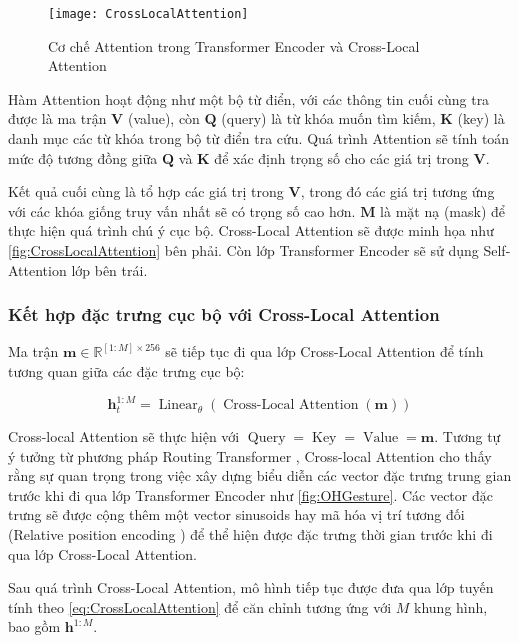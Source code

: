\begin{figure}[H]
	\centering
	\texttt{[image: CrossLocalAttention]}
	\caption{Cơ chế Attention trong Transformer Encoder và Cross-Local Attention}
	\label{fig:CrossLocalAttention}
\end{figure}

Hàm Attention hoạt động như một bộ từ điển, với các thông tin cuối cùng tra được là ma trận $\mathbf{V}$ (value), còn $\mathbf{Q}$ (query) là từ khóa muốn tìm kiếm, $\mathbf{K}$ (key) là danh mục các từ khóa trong bộ từ điển tra cứu. Quá trình Attention sẽ tính toán mức độ tương đồng giữa \( \mathbf{Q} \) và \( \mathbf{K} \) để xác định trọng số cho các giá trị trong \( \mathbf{V} \). 

Kết quả cuối cùng là tổ hợp các giá trị trong \( \mathbf{V} \), trong đó các giá trị tương ứng với các khóa giống truy vấn nhất sẽ có trọng số cao hơn. $\mathbf{M}$ là mặt nạ (mask) để thực hiện quá trình chú ý cục bộ. Cross-Local Attention sẽ được minh họa như \autoref{fig:CrossLocalAttention} bên phải. Còn lớp Transformer Encoder sẽ sử dụng Self-Attention lớp bên trái.

\subsubsection{Kết hợp đặc trưng cục bộ với Cross-Local Attention}

Ma trận $\mathbf{m} \in \mathbb{R}^{[1:M] \times 256}$ sẽ tiếp tục đi qua lớp Cross-Local Attention để tính tương quan giữa các đặc trưng cục bộ: 

\begin{equation}
	\mathbf{h}^{1:M}_{t}  = \operatorname{Linear}_{\theta}  ( \operatorname{Cross-Local\ Attention}( \mathbf{m}) )
	\label{eq:CrossLocalAttention}
\end{equation}

Cross-local Attention sẽ thực hiện với $\operatorname{Query} = \operatorname{Key} = \operatorname{Value} = \mathbf{m}$. 
Tương tự ý tưởng từ phương pháp Routing Transformer \cite{roy2021efficient}, Cross-local Attention cho thấy rằng sự quan trọng trong việc xây dựng biểu diễn các vector đặc trưng trung gian trước khi đi qua lớp Transformer Encoder như \autoref{fig:OHGesture}. 
Các vector đặc trưng sẽ được cộng thêm một vector sinusoids hay mã hóa vị trí tương đối (Relative position encoding \cite{vaswani2017attention}) để thể hiện được đặc trưng thời gian trước khi đi qua lớp Cross-Local Attention.


Sau quá trình Cross-Local Attention, mô hình tiếp tục được đưa qua lớp tuyến tính theo \autoref{eq:CrossLocalAttention} để căn chỉnh tương ứng với $M$ khung hình, bao gồm $\mathbf{h}^{1:M}$.



